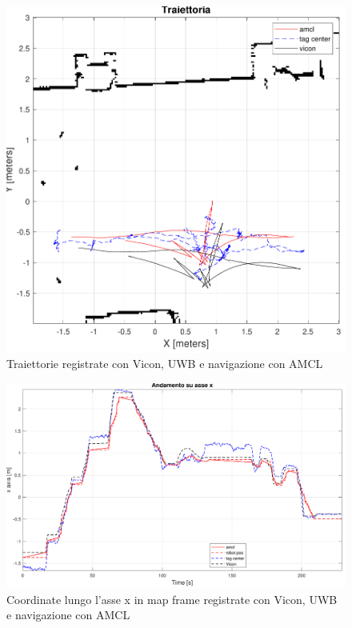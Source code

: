 \begin{figure}[] 
	\centering    
	\includegraphics[height=.4\textheight]{grafici_stanzavolo_vicon/figure1.pdf}
	\caption{Traiettorie registrate con Vicon, UWB e navigazione con AMCL}
	\label{fig: traiettorie_vicon_charlie}
\end{figure}

\begin{figure}[] 
	\centering    
	\includegraphics[height=.3\textheight]{grafici_stanzavolo_vicon/figure5.pdf}
	\caption{Coordinate lungo l'asse x in map frame registrate con Vicon, UWB e navigazione con AMCL}
	\label{fig: asse_x_vicon_charlie}
\end{figure}

